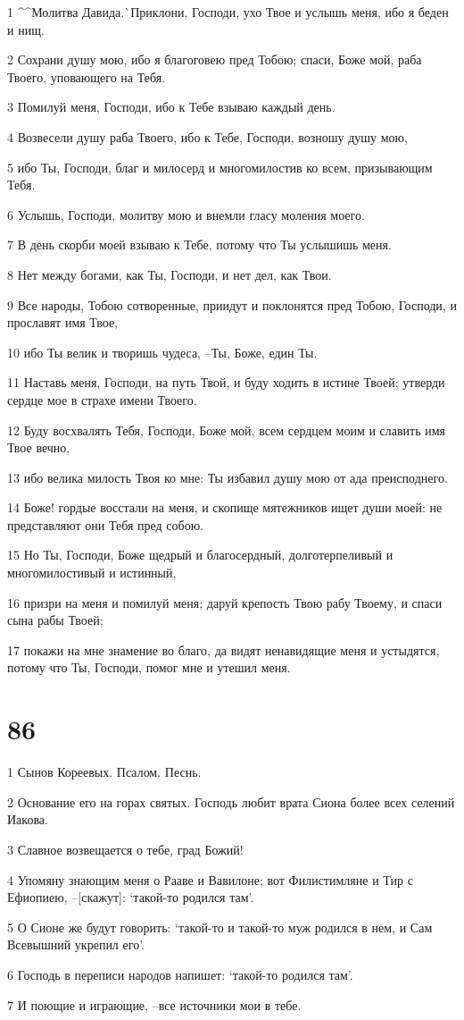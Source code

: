 \par 1 ^^Молитва Давида.^^ Приклони, Господи, ухо Твое и услышь меня, ибо я беден и нищ.
\par 2 Сохрани душу мою, ибо я благоговею пред Тобою; спаси, Боже мой, раба Твоего, уповающего на Тебя.
\par 3 Помилуй меня, Господи, ибо к Тебе взываю каждый день.
\par 4 Возвесели душу раба Твоего, ибо к Тебе, Господи, возношу душу мою,
\par 5 ибо Ты, Господи, благ и милосерд и многомилостив ко всем, призывающим Тебя.
\par 6 Услышь, Господи, молитву мою и внемли гласу моления моего.
\par 7 В день скорби моей взываю к Тебе, потому что Ты услышишь меня.
\par 8 Нет между богами, как Ты, Господи, и нет дел, как Твои.
\par 9 Все народы, Тобою сотворенные, приидут и поклонятся пред Тобою, Господи, и прославят имя Твое,
\par 10 ибо Ты велик и творишь чудеса, --Ты, Боже, един Ты.
\par 11 Наставь меня, Господи, на путь Твой, и буду ходить в истине Твоей; утверди сердце мое в страхе имени Твоего.
\par 12 Буду восхвалять Тебя, Господи, Боже мой, всем сердцем моим и славить имя Твое вечно,
\par 13 ибо велика милость Твоя ко мне: Ты избавил душу мою от ада преисподнего.
\par 14 Боже! гордые восстали на меня, и скопище мятежников ищет души моей: не представляют они Тебя пред собою.
\par 15 Но Ты, Господи, Боже щедрый и благосердный, долготерпеливый и многомилостивый и истинный,
\par 16 призри на меня и помилуй меня; даруй крепость Твою рабу Твоему, и спаси сына рабы Твоей;
\par 17 покажи на мне знамение во благо, да видят ненавидящие меня и устыдятся, потому что Ты, Господи, помог мне и утешил меня.

\chapter{86}

\par 1 Сынов Кореевых. Псалом. Песнь.
\par 2 Основание его на горах святых. Господь любит врата Сиона более всех селений Иакова.
\par 3 Славное возвещается о тебе, град Божий!
\par 4 Упомяну знающим меня о Рааве и Вавилоне; вот Филистимляне и Тир с Ефиопиею, --[скажут]: `такой-то родился там'.
\par 5 О Сионе же будут говорить: `такой-то и такой-то муж родился в нем, и Сам Всевышний укрепил его'.
\par 6 Господь в переписи народов напишет: `такой-то родился там'.
\par 7 И поющие и играющие, --все источники мои в тебе.


